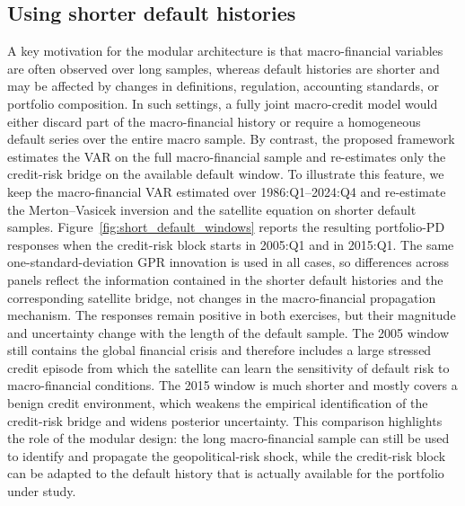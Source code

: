 \subsection{Using shorter default histories}
\label{sec:short_default_histories}
A key motivation for the modular architecture is that macro-financial variables
are often observed over long samples, whereas default histories are shorter and
may be affected by changes in definitions, regulation, accounting standards, or
portfolio composition. In such settings, a fully joint macro-credit model would
either discard part of the macro-financial history or require a homogeneous
default series over the entire macro sample. By contrast, the proposed
framework estimates the VAR on the full macro-financial sample and re-estimates
only the credit-risk bridge on the available default window.
To illustrate this feature, we keep the macro-financial VAR estimated over
1986:Q1--2024:Q4 and re-estimate the Merton--Vasicek inversion and the
satellite equation on shorter default samples. Figure~\ref{fig:short_default_windows}
reports the resulting portfolio-PD responses when the credit-risk block starts
in 2005:Q1 and in 2015:Q1. The same one-standard-deviation GPR innovation is
used in all cases, so differences across panels reflect the information
contained in the shorter default histories and the corresponding satellite
bridge, not changes in the macro-financial propagation mechanism.
The responses remain positive in both exercises, but their magnitude and
uncertainty change with the length of the default sample. The 2005 window still
contains the global financial crisis and therefore includes a large stressed
credit episode from which the satellite can learn the sensitivity of default
risk to macro-financial conditions. The 2015 window is much shorter and mostly
covers a benign credit environment, which weakens the empirical identification
of the credit-risk bridge and widens posterior uncertainty. This comparison
highlights the role of the modular design: the long macro-financial sample can
still be used to identify and propagate the geopolitical-risk shock, while the
credit-risk block can be adapted to the default history that is actually
available for the portfolio under study.

